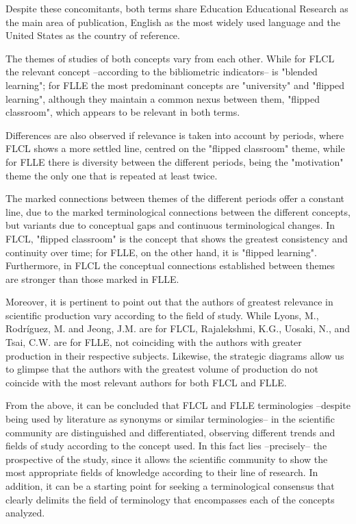 \documentclass{textolivre-html}
\begin{document}
Despite these concomitants, both terms share Education Educational Research as the main area of publication, English as the most widely used language and the United States as the country of reference.

The themes of studies of both concepts vary from each other. While for FLCL the relevant concept –according to the bibliometric indicators– is "blended learning"; for FLLE the most predominant concepts are "university" and "flipped learning", although they maintain a common nexus between them, "flipped classroom", which appears to be relevant in both terms.

Differences are also observed if relevance is taken into account by periods, where FLCL shows a more settled line, centred on the "flipped classroom" theme, while for FLLE there is diversity between the different periods, being the "motivation" theme the only one that is repeated at least twice.

The marked connections between themes of the different periods offer a constant line, due to the marked terminological connections between the different concepts, but variants due to conceptual gaps and continuous terminological changes. In FLCL, "flipped classroom" is the concept that shows the greatest consistency and continuity over time; for FLLE, on the other hand, it is "flipped learning". Furthermore, in FLCL the conceptual connections established between themes are stronger than those marked in FLLE.

Moreover, it is pertinent to point out that the authors of greatest relevance in scientific production vary according to the field of study. While Lyons, M., Rodríguez, M. and Jeong, J.M. are for FLCL, Rajalekshmi, K.G., Uosaki, N., and Tsai, C.W. are for FLLE, not coinciding with the authors with greater production in their respective subjects. Likewise, the strategic diagrams allow us to glimpse that the authors with the greatest volume of production do not coincide with the most relevant authors for both FLCL and FLLE.

From the above, it can be concluded that FLCL and FLLE terminologies –despite being used by literature as synonyms or similar terminologies– in the scientific community are distinguished and differentiated, observing different trends and fields of study according to the concept used. In this fact lies –precisely– the prospective of the study, since it allows the scientific community to show the most appropriate fields of knowledge according to their line of research. In addition, it can be a starting point for seeking a terminological consensus that clearly delimits the field of terminology that encompasses each of the concepts analyzed.
\end{document}
